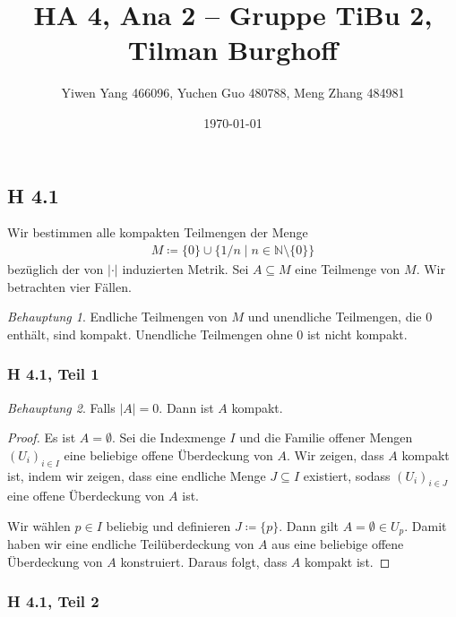 \documentclass[draft,a5paper]{article}
\author{Yiwen Yang 466096, Yuchen Guo 480788, Meng Zhang 484981}
\date{\today}
\title{HA 4, Ana 2 -- Gruppe TiBu 2, Tilman Burghoff}
\theoremstyle{remark}
\newtheorem*{beh}{Behauptung}
\newcommand{\envert}[1]{\left\lvert#1\right\rvert}
\begin{document}
\maketitle

\newpage

\subsection*{H 4.1}

Wir bestimmen alle kompakten Teilmengen der Menge
\begin{align*}
  M \coloneq \{0\} \cup \{1/n \mid n \in \mathbb{N} \setminus \{0\}\}
\end{align*}
bezüglich der von \(\envert{\cdot}\) induzierten Metrik.  Sei \(A \subseteq M\)
eine Teilmenge von \(M\).  Wir betrachten vier Fällen.

\begin{beh}
  Endliche Teilmengen von \(M\) und unendliche Teilmengen, die \(0\)
  enthält, sind kompakt.  Unendliche Teilmengen ohne \(0\) ist nicht
  kompakt.
\end{beh}

\subsubsection*{H 4.1, Teil 1}

\begin{beh}
  Falls \(\envert{A} = 0\).  Dann ist \(A\) kompakt.
\end{beh}

\begin{proof}
  Es ist \(A = \emptyset\).  Sei die Indexmenge
  \(I\) und die Familie offener Mengen \((U_{i})_{i \in I}\) eine
  beliebige offene Überdeckung von \(A\).  Wir zeigen, dass \(A\)
  kompakt ist, indem wir zeigen, dass eine endliche Menge
  \(J \subseteq I\) existiert, sodass \((U_{i})_{i \in J}\) eine offene
  Überdeckung von \(A\) ist.

  Wir wählen \(p \in I\) beliebig und definieren \(J \coloneq \{p\}\).  Dann
  gilt \(A = \emptyset \in U_{p}\).  Damit haben wir eine endliche
  Teilüberdeckung von \(A\) aus eine beliebige offene Überdeckung von
  \(A\) konstruiert. Daraus folgt, dass \(A\) kompakt ist.
\end{proof}

\subsubsection*{H 4.1, Teil 2}
\end{document}
